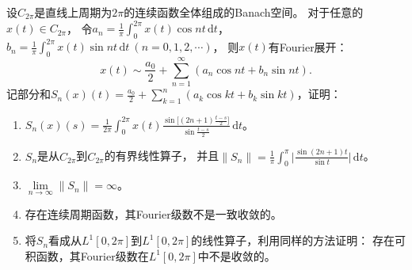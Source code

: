\begin{20}
    设$C_{2\pi}$是直线上周期为$2\pi$的连续函数全体组成的Banach空间。
    对于任意的$x(t)\in C_{2\pi}$，
    令$\displaystyle a_n=\frac{1}{\pi}\int_0^{2\pi}x(t)\cos nt\,\mathrm{d}t$，
    $\displaystyle b_n=\frac{1}{\pi}\int_0^{2\pi}x(t)\sin nt\,\mathrm{d}t\ (n=0,1,2,\cdots)$，
    则$x(t)$有Fourier展开：
    $$x(t)\sim\frac{a_0}{2}+\sum_{n=1}^\infty(a_n\cos nt+b_n\sin nt).$$
    记部分和$\displaystyle S_n(x)(t)=\frac{a_0}{2}+\sum_{k=1}^n(a_k\cos kt+b_k\sin kt)$，证明：
    \begin{enumerate}[label=(\roman*)]
    \item $\displaystyle S_n(x)(s)=\frac{1}{2\pi}\int_0^{2\pi}x(t)
    \frac{\sin\big[(2n+1)\frac{t-s}{2}\big]}{\sin\frac{t-s}{2}}\,\mathrm{d}t$。
    \item $S_{n}$是从$C_{2\pi}$到$C_{2\pi}$的有界线性算子，
    并且$\displaystyle \|S_n\|=\frac{1}{\pi}\int_0^{\pi}
    \bigg|\frac{\sin(2n+1)t}{\sin t}\bigg|\,\mathrm{d}t$。
    \item $\lim\limits_{n\to\infty}\|S_n\|=\infty$。
    \item 存在连续周期函数，其Fourier级数不是一致收敛的。
    \item 将$S_n$看成从$L^1[0,2\pi]$到$L^1[0,2\pi]$的线性算子，利用同样的方法证明：
    存在可积函数，其Fourier级数在$L^1[0,2\pi]$中不是收敛的。
    \end{enumerate}
\end{20}
